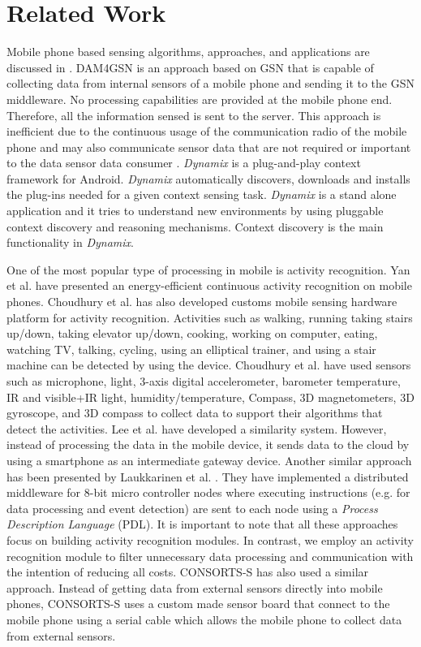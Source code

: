 \documentclass[journal]{IEEEtran}
\begin{document}
\section{Related Work}
\label{sec:Related_Work}

 Mobile phone based sensing algorithms, approaches, and applications are discussed in \cite{P217}. DAM4GSN \cite{ZMP001} is  an approach based on GSN that is capable of collecting data from internal sensors of a mobile phone and sending it to the GSN middleware. No processing capabilities are provided at the mobile phone end. Therefore, all the information sensed is sent to the server. This approach is inefficient due to the continuous usage of the communication radio of the mobile phone and may also communicate sensor data that are not required or important to the data sensor data consumer \cite{ZMP001}. \textit{Dynamix} \cite{P627} is a plug-and-play context framework for Android. \textit{Dynamix} automatically discovers, downloads and installs the plug-ins needed for a given context sensing task. \textit{Dynamix} is a stand alone application and it tries to understand new environments by using pluggable context discovery and reasoning mechanisms.  Context discovery is the main functionality in \textit{Dynamix}. 


One of the most popular type of processing in mobile is activity recognition. Yan et al. \cite{P629} have presented an energy-efficient continuous activity recognition on mobile phones. Choudhury et al. \cite{Z1016} has also developed customs mobile sensing hardware platform for activity recognition. Activities such as walking, running taking stairs up/down, taking elevator up/down, cooking, working on computer, eating, watching TV, talking, cycling, using an elliptical trainer, and using a stair machine can be detected by using the device. Choudhury et al. have used sensors such as microphone, light, 3-axis digital accelerometer, barometer temperature, IR and visible+IR light, humidity/temperature, Compass,  3D magnetometers, 3D gyroscope, and 3D compass to collect data to support their algorithms that detect the activities. Lee et al. \cite{Z1017} have developed a similarity system. However, instead of processing the data in the mobile device, it sends data to the cloud by using a smartphone as an intermediate gateway device. Another similar approach has been presented by Laukkarinen et al. \cite{Z1018}. They have implemented a distributed middleware for 8-bit micro controller nodes where executing instructions (e.g. for data processing and event detection) are sent to each node using a \textit{Process Description Language} (PDL). It is important to note that all these approaches focus on building activity recognition modules. In contrast, we employ an activity recognition module to filter unnecessary data processing and communication with the intention of reducing all costs. CONSORTS-S \cite{Z1020} has also used a similar approach. Instead of getting data from external sensors directly into mobile phones, CONSORTS-S uses a custom made sensor board that connect to the mobile phone using a serial cable which allows the mobile phone to collect data from external sensors.
\end{document}
